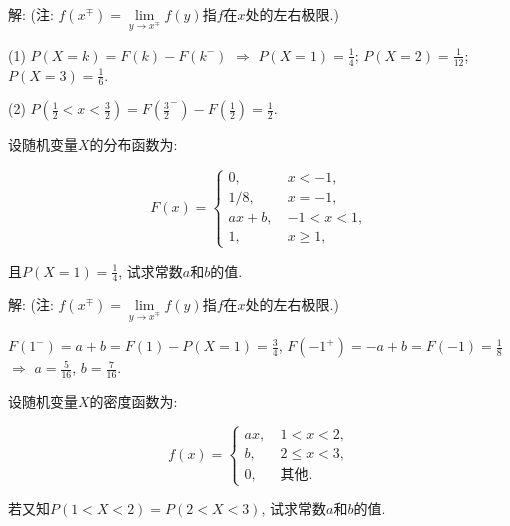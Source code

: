 \documentclass[standard]{ExBook}
\begin{document}
\begin{qitems}
\vspace{-5em}

    \begin{bbox}
解: (注: $f(x^\mp)=\lim\limits_{y\to x^\mp}f(y)$指$f$在$x$处的左右极限.)

(1) $P(X=k)=F(k)-F(k^{-})$ $\Longrightarrow$ $P(X=1)=\frac{1}{4}$; $P(X=2)=\frac{1}{12}$; $P(X=3)=\frac{1}{6}$.

(2) $P(\frac{1}{2}<x<\frac{3}{2})=F(\frac{3}{2}^-)-F(\frac{1}{2})=\frac{1}{2}$.
    \end{bbox}

\vspace{-5em}

    \begin{bbox}
    \begin{shaded}
        \qitem
设随机变量$X$的分布函数为:
\vspace{-2em}
\begin{center}
\begin{equation}
    F(x)=
    \left\{
    \begin{array}{cl}
        \nonumber
        0,\ &x < -1,\\
        1/8,\ &x=-1,\\
        ax+b,\ &-1 < x < 1,\\
        1,\ &x \geq 1,
    \end{array}
    \right.
\end{equation}
\end{center}
且$P(X=1)=\displaystyle\frac{1}{4}$, 试求常数$a$和$b$的值.
    \end{shaded}
    \end{bbox}

\vspace{-5em}

    \begin{bbox}
解: (注: $f(x^\mp)=\lim\limits_{y\to x^\mp}f(y)$指$f$在$x$处的左右极限.)

$F(1^-)=a+b=F(1)-P(X=1)=\displaystyle\frac{3}{4}$, $F(-1^+)=-a+b=F(-1)=\displaystyle\frac{1}{8}$ $\Longrightarrow$ $a=\displaystyle\frac{5}{16}$, $b=\displaystyle\frac{7}{16}$.
    \end{bbox}

\vspace{-5em}

    \begin{bbox}
    \begin{shaded}
        \qitem
设随机变量$X$的密度函数为:
\vspace{-2em}
\begin{center}
\begin{equation}
    f(x)=
    \left\{
    \begin{array}{cl}
        \nonumber
        ax,\ &1 < x < 2,\\
        b,\ &2 \leq x < 3,\\
        0,\ &\text{其他}.
    \end{array}
    \right.
\end{equation}
\end{center}
若又知$P(1 < X <2)=P(2 < X < 3)$, 试求常数$a$和$b$的值.
    \end{shaded}
    \end{bbox}


\end{qitems}
\end{document}

